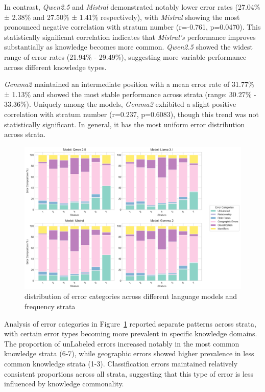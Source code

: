 In contrast, \textit{Qwen2.5} and \textit{Mistral} demonstrated notably lower error rates (27.04\% ± 2.38\% and 27.50\% ± 1.41\% respectively), with \textit{Mistral} showing the most pronounced negative correlation with stratum number (r=-0.761, p=0.0470).
This statistically significant correlation indicates that \textit{Mistral's} performance improves substantially as knowledge becomes more common.
\textit{Qwen2.5} showed the widest range of error rates (21.94\% - 29.49\%), suggesting more variable performance across different knowledge types.

\textit{Gemma2} maintained an intermediate position with a mean error rate of 31.77\% ± 1.13\% and showed the most stable performance across strata (range: 30.27\% - 33.36\%).
Uniquely among the models, \textit{Gemma2} exhibited a slight positive correlation with stratum number (r=0.237, p=0.6083), though this trend was not statistically significant.
In general, it has the most uniform error distribution across strata.

\begin{figure}[ht!]
    \centering
    \begin{minipage}[b]{\textwidth}
        \centering
        \includegraphics[width=\textwidth]{res/category_distribution_analysis}
    \end{minipage}
    \caption{distribution of error categories across different language models and frequency strata}
    \label{fig:category_distribution_analysis}
\end{figure}

Analysis of error categories in Figure~\ref{fig:category_distribution_analysis} reported separate patterns across strata, with certain error types becoming more prevalent in specific knowledge domains.
The proportion of unLabeled errors increased notably in the most common knowledge strata (6-7), while geographic errors showed higher prevalence in less common knowledge strata (1-3).
Classification errors maintained relatively consistent proportions across all strata, suggesting that this type of error is less influenced by knowledge commonality.

